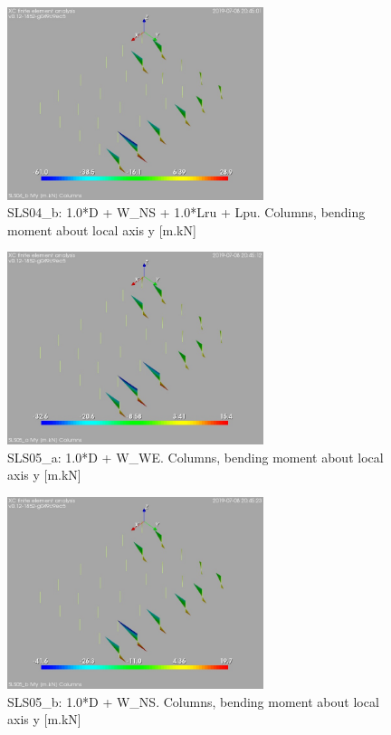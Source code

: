 \begin{figure}
\begin{center}
\includegraphics[width=75mm]{./annex_res_columns/graphics/resSimplLC/SLS04_bcolumnsMy}
\caption{SLS04\_b: 1.0*D + W\_NS + 1.0*Lru + Lpu. Columns, bending moment about local axis y [m.kN]}
\end{center}
\end{figure}

\begin{figure}
\begin{center}
\includegraphics[width=75mm]{./annex_res_columns/graphics/resSimplLC/SLS05_acolumnsMy}
\caption{SLS05\_a: 1.0*D + W\_WE. Columns, bending moment about local axis y [m.kN]}
\end{center}
\end{figure}

\begin{figure}
\begin{center}
\includegraphics[width=75mm]{./annex_res_columns/graphics/resSimplLC/SLS05_bcolumnsMy}
\caption{SLS05\_b: 1.0*D + W\_NS. Columns, bending moment about local axis y [m.kN]}
\end{center}
\end{figure}

